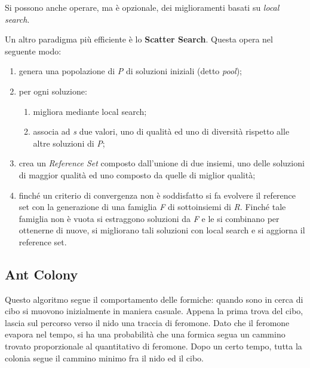 \documentclass[11pt, oneside]{book}
\begin{document}
Si possono anche operare, ma \`e opzionale, dei miglioramenti basati
su {\em local search}.

\par\bigskip

Un altro paradigma pi\`u efficiente \`e lo {\bf Scatter
  Search}. Questa opera nel seguente modo:

\begin{enumerate}
\item genera una popolazione di {\em P} di soluzioni iniziali (detto
  {\em pool});
\item per ogni soluzione:

  \begin{enumerate}
  \item migliora mediante local search;
  \item associa ad {\em s} due valori, uno di qualit\`a ed uno di
    diversit\`a rispetto alle altre soluzioni di {\em P};
  \end{enumerate}

\item crea un {\em Reference Set} composto dall'unione di due insiemi,
  uno delle soluzioni di maggior qualit\`a ed uno composto da quelle
  di miglior qualit\`a;

\item finch\'e un criterio di convergenza non \`e soddisfatto si fa
  evolvere il reference set con la generazione di una famiglia {\em F}
  di sottoinsiemi di {\em R}. Finch\'e tale famiglia non \`e vuota si
  estraggono soluzioni da {\em F} e le si combinano per ottenerne di
  nuove, si migliorano tali soluzioni con local search e si aggiorna
  il reference set.

\end{enumerate}

\subsection{Ant Colony}

Questo algoritmo segue il comportamento delle formiche: quando sono in
cerca di cibo si muovono inizialmente in maniera casuale. Appena la
prima trova del cibo, lascia sul percorso verso il nido una traccia di
feromone. Dato che il feromone evapora nel tempo, si ha una
probabilit\`a che una formica segua un cammino trovato proporzionale
al quantitativo di feromone. Dopo un certo tempo, tutta la colonia
segue il cammino minimo fra il nido ed il cibo.

\par\bigskip
\end{document}
